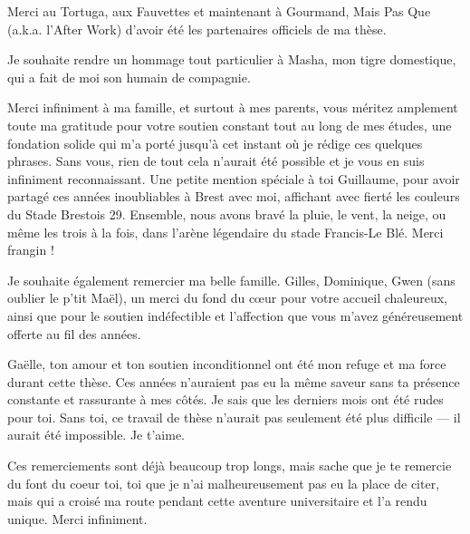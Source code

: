 \begin{refsection}
Merci au Tortuga, aux Fauvettes et maintenant à Gourmand, Mais Pas Que
(a.k.a. l'After Work) d'avoir été les partenaires officiels de ma thèse.

Je souhaite rendre un hommage tout particulier à Masha, mon tigre
domestique, qui a fait de moi son humain de compagnie.

Merci infiniment à ma famille, et surtout à mes parents, vous méritez
amplement toute ma gratitude pour votre soutien constant tout au long de
mes études, une fondation solide qui m'a porté jusqu'à cet instant où je
rédige ces quelques phrases. Sans vous, rien de tout cela n'aurait été
possible et je vous en suis infiniment reconnaissant. Une petite mention
spéciale à toi Guillaume, pour avoir partagé ces années inoubliables à
Brest avec moi, affichant avec fierté les couleurs du Stade Brestois 29.
Ensemble, nous avons bravé la pluie, le vent, la neige, ou même les
trois à la fois, dans l'arène légendaire du stade Francis-Le Blé. Merci
frangin !

Je souhaite également remercier ma belle famille. Gilles, Dominique,
Gwen (sans oublier le p'tit Maël), un merci du fond du cœur pour votre
accueil chaleureux, ainsi que pour le soutien indéfectible et
l'affection que vous m'avez généreusement offerte au fil des années.

Gaëlle, ton amour et ton soutien inconditionnel ont été mon refuge et ma
force durant cette thèse. Ces années n'auraient pas eu la même saveur
sans ta présence constante et rassurante à mes côtés. Je sais que les
derniers mois ont été rudes pour toi. Sans toi, ce travail de thèse
n'aurait pas seulement été plus difficile --- il aurait été impossible.
Je t'aime.

Ces remerciements sont déjà beaucoup trop longs, mais sache que je te
remercie du font du coeur toi, toi que je n'ai malheureusement pas eu la
place de citer, mais qui a croisé ma route pendant cette aventure
universitaire et l'a rendu unique. Merci infiniment.

\printbibliography[heading=subbibintoc, title={Bibliographie}]
\end{refsection}